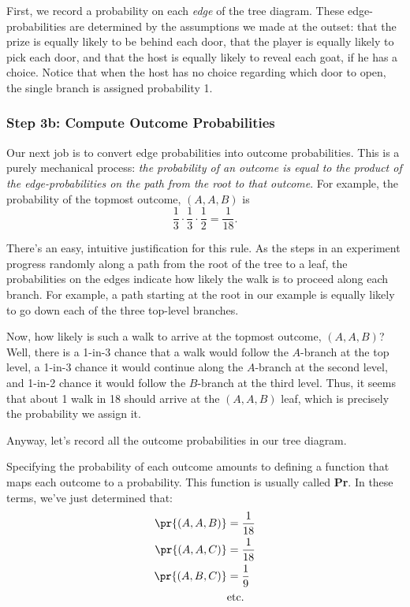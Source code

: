 First, we record a probability on each \textit{edge} of the tree
diagram.  These edge-probabilities are determined by the assumptions
we made at the outset: that the prize is equally likely to be behind
each door, that the player is equally likely to pick each door, and
that the host is equally likely to reveal each goat, if he has a
choice.  Notice that when the host has no choice regarding which door
to open, the single branch is assigned probability 1.
%
\begin{center}
\end{center}

\subsubsection{Step 3b: Compute Outcome Probabilities}

Our next job is to convert edge probabilities into outcome
probabilities.  This is a purely mechanical process: \textit{the
probability of an outcome is equal to the product of the
edge-probabilities on the path from the root to that outcome}.  For
example, the probability of the topmost outcome, $(A, A, B)$ is
\[
\frac{1}{3} \cdot \frac{1}{3} \cdot \frac{1}{2} = \frac{1}{18}.
\]

There's an easy, intuitive justification for this rule.  As the steps in
an experiment progress randomly along a path from the root of the tree to
a leaf, the probabilities on the edges indicate how likely the walk is to
proceed along each branch.  For example, a path starting at the root in
our example is equally likely to go down each of the three top-level
branches.

Now, how likely is such a walk to arrive at the topmost outcome, $(A,
A, B)$?  Well, there is a 1-in-3 chance that a walk would follow the
$A$-branch at the top level, a 1-in-3 chance it would continue along
the $A$-branch at the second level, and 1-in-2 chance it would follow
the $B$-branch at the third level.  Thus, it seems that about 1 walk
in 18 should arrive at the $(A, A, B)$ leaf, which is precisely the
probability we assign it.

Anyway, let's record all the outcome probabilities in our tree
diagram.
%
\begin{center}

\end{center}

Specifying the probability of each outcome amounts to defining a
function that maps each outcome to a probability.  This function is
usually called \textbf{Pr}.  In these terms, we've just determined
that:
%
\begin{align*}
\pr{(A, A, B)} & = \frac{1}{18} \\
\pr{(A, A, C)} & = \frac{1}{18} \\
\pr{(A, B, C)} & = \frac{1}{9} \\
               & \text{etc.}
\end{align*}

